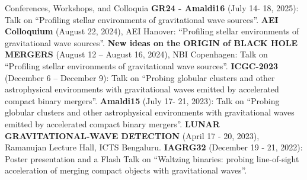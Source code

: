 \begin{rubric}{Conferences, Workshops, and Colloquia}
\entry*[] \textbf{GR24 - Amaldi16} (July 14- 18, 2025): Talk on ``Profiling stellar environments of gravitational wave sources''.
%
\entry*[] \textbf{AEI Colloquium} (August 22, 2024), AEI Hanover: ``Profiling stellar environments of gravitational wave sources''.
%
\entry*[] \textbf{New ideas on the ORIGIN of BLACK HOLE MERGERS} (August 12 – August 16, 2024), NBI Copenhagen: Talk on ``Profiling stellar environments of gravitational wave sources''.
%
\entry*[] \textbf{ICGC-2023} (December 6 – December 9): Talk on ``Probing globular clusters and other astrophysical environments with gravitational waves emitted by accelerated compact binary mergers''.
%
\entry*[] \textbf{Amaldi15} (July 17- 21, 2023): Talk on ``Probing globular clusters and other astrophysical environments with gravitational waves emitted by accelerated compact binary mergers''.
%
\entry*[] \textbf{LUNAR GRAVITATIONAL-WAVE DETECTION} (April 17 - 20, 2023), Ramanujan Lecture Hall, ICTS Bengaluru.
%
\entry*[] \textbf{IAGRG32} (December 19 - 21, 2022): Poster presentation and a Flash Talk on ``Waltzing binaries: probing line-of-sight acceleration of merging compact objects with gravitational waves''.
%

\end{rubric}

